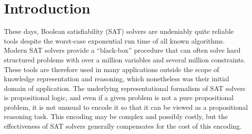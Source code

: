 
\section{Introduction}

These days, Boolean satisfiability (SAT) solvers are undeniably quite reliable
tools despite the worst-case exponential run time of all known
algorithms. Modern SAT solvers provide a ``black-box'' procedure that can often
solve hard structured problems with over a million variables and several million
constraints. These tools are therefore used in many applications outside the
scope of knowledge representation and reasoning, which nonetheless was their
initial domain of application. The underlying representational formalism of SAT
solvers is propositional logic, and even if a given problem is not a pure
propositional problem, it is not unusual to encode it so that it can be viewed
as a propositional reasoning task. This encoding may be complex and possibly
costly, but the effectiveness of SAT solvers generally compensates for the cost
of this encoding.
